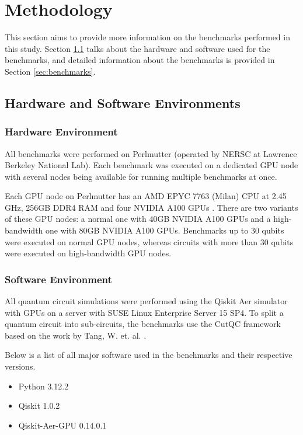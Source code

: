 \section{Methodology}
\label{chap:methodology}

This section aims to provide more information on the benchmarks performed in this study. Section \ref{sec:environment} talks about the hardware and software used for the benchmarks, and detailed information about the benchmarks is provided in Section \ref{sec:benchmarks}.




\subsection{Hardware and Software Environments}
\label{sec:environment}

\subsubsection{Hardware Environment}

All benchmarks were performed on Perlmutter \cite{perlmutter} (operated by NERSC at Lawrence Berkeley National Lab). Each benchmark was executed on a dedicated GPU node with several nodes being available for running multiple benchmarks at once.  

Each GPU node on Perlmutter has an AMD EPYC 7763 (Milan) CPU at 2.45 GHz, 256GB DDR4 RAM and four NVIDIA A100 GPUs \cite{perlmutter_specs}. There are two variants of these GPU nodes: a normal one with 40GB NVIDIA A100 GPUs and a high-bandwidth one with 80GB NVIDIA A100 GPUs. Benchmarks up to 30 qubits were executed on normal GPU nodes, whereas circuits with more than 30 qubits were executed on high-bandwidth GPU nodes.


\subsubsection{Software Environment}

All quantum circuit simulations were performed using the Qiskit Aer simulator \cite{qiskitPaper}\cite{qiskit}\cite{qiskitAerGPU} with GPUs on a server with SUSE Linux Enterprise Server 15 SP4. To split a quantum circuit into sub-circuits, the benchmarks use the CutQC framework \cite{cutqc} based on the work by Tang, W. et. al. \cite{tang2021cutqc}.  

\noindent Below is a list of all major software used in the benchmarks and their respective versions.
\begin{itemize}
    \item Python 3.12.2
    \item Qiskit 1.0.2
    \item Qiskit-Aer-GPU 0.14.0.1
\end{itemize}




